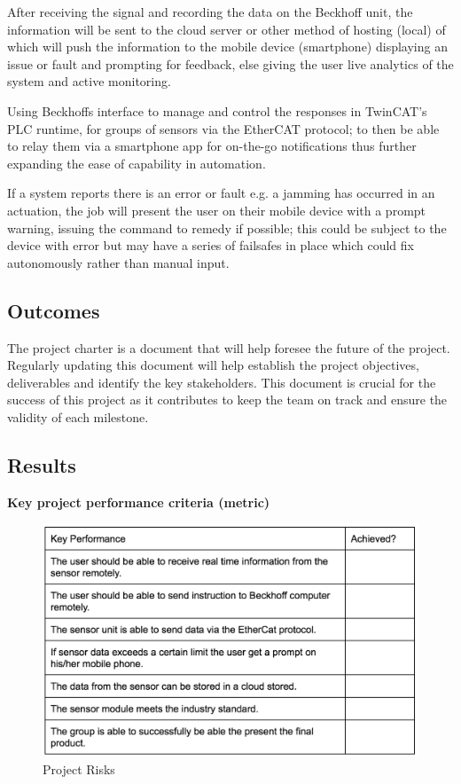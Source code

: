 \documentclass[a4paper, 10pt, conference]{IEEEconf}
\begin{document}
After receiving the signal and recording the data on the Beckhoff unit, the information will be sent to the cloud server or other method of hosting (local) of which will push the information to the mobile device (smartphone) displaying an issue or fault and prompting for feedback, else giving the user live analytics of the system and active monitoring.

Using Beckhoffs interface to manage and control the responses in TwinCAT's PLC runtime, for groups of sensors via the EtherCAT protocol; to then be able to relay them via a smartphone app for on-the-go notifications thus further expanding the ease of capability in automation.

If a system reports there is an error or fault e.g. a jamming has occurred in an actuation, the job will present the user on their mobile device with a prompt warning, issuing the command to remedy if possible; this could be subject to the device with error but may have a series of failsafes in place which could fix autonomously rather than manual input.

\subsection{Outcomes}


The project charter is a document that will help foresee the future of the project. Regularly updating this document will help establish the project objectives, deliverables and identify the key stakeholders. This document is crucial for the success of this project as it contributes to keep the team on track and ensure the validity of each milestone. 

\subsection{Results}
{\bf Key project performance criteria (metric)}

\begin{figure}[h!]
  \includegraphics[width=\linewidth]{images/Preformance}
  \caption{Project Risks}
  \label{fig:ProjectRisks}
\end{figure}
\end{document}
